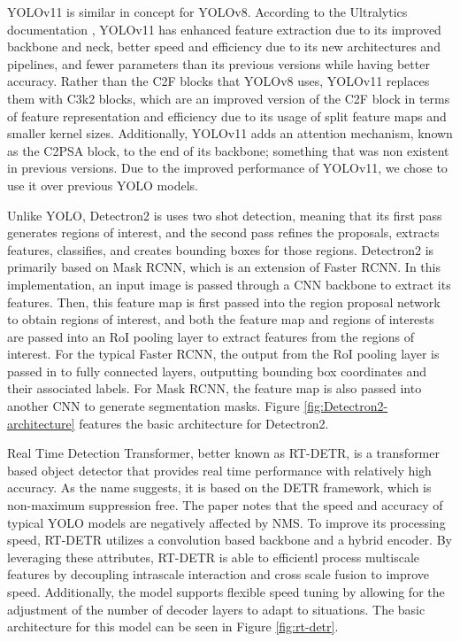 \documentclass[stu,12pt,floatsintext]{apa7}
\begin{document}
YOLOv11 is similar in concept for YOLOv8. According to the Ultralytics documentation \parencite{yolo11_ultralytics}, YOLOv11 has enhanced feature extraction due to its improved backbone and neck, better speed and efficiency due to its new architectures and pipelines, and fewer parameters than its previous versions while having better accuracy. Rather than the C2F blocks that YOLOv8 uses, YOLOv11 replaces them with C3k2 blocks, which are an improved version of the C2F block in terms of feature representation and efficiency due to its usage of split feature maps and smaller kernel sizes. Additionally, YOLOv11 adds an attention mechanism, known as the C2PSA block, to the end of its backbone; something that was non existent in previous versions. Due to the improved performance of YOLOv11, we chose to use it over previous YOLO models.

Unlike YOLO, Detectron2 is uses two shot detection, meaning that its first pass generates regions of interest, and the second pass refines the proposals, extracts features, classifies, and creates bounding boxes for those regions. Detectron2 is primarily based on Mask RCNN, which is an extension of Faster RCNN. In this implementation, an input image is passed through a CNN backbone to extract its features. Then, this feature map is first passed into the region proposal network to obtain regions of interest, and both the feature map and regions of interests are passed into an RoI pooling layer to extract features from the regions of interest. For the typical Faster RCNN, the output from the RoI pooling layer is passed in to fully connected layers, outputting bounding box coordinates and their associated labels. For Mask RCNN, the feature map is also passed into another CNN to generate segmentation masks. Figure \ref{fig:Detectron2-architecture} features the basic architecture for Detectron2.

%
Real Time Detection Transformer, better known as RT-DETR, is a transformer based object detector that provides real time performance with relatively high accuracy. As the name suggests, it is based on the DETR framework, which is non-maximum suppression free. The paper notes that the speed and accuracy of typical YOLO models are negatively affected by NMS. To improve its processing speed, RT-DETR utilizes a convolution based backbone and a hybrid encoder. By leveraging these attributes, RT-DETR is able to efficientl process multiscale features by decoupling intrascale interaction and cross scale fusion to improve speed. Additionally, the model supports flexible speed tuning by allowing for the adjustment of the number of decoder layers to adapt to situations. The basic architecture for this model can be seen in Figure \ref{fig:rt-detr}.
\end{document}
